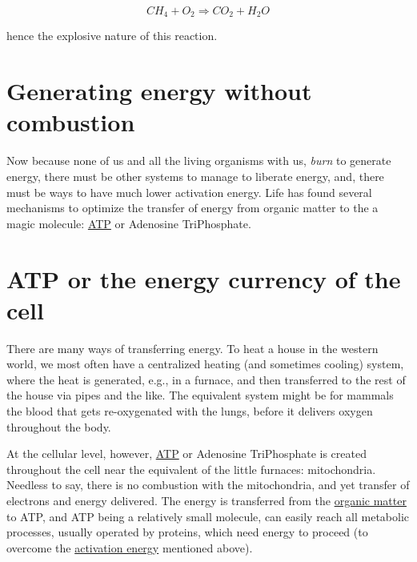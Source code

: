 \documentclass[]{book}
\theoremstyle{definition}
\theoremstyle{definition}
\theoremstyle{definition}
\theoremstyle{remark}
\begin{document}
\begin{equation}
CH_4 + O_2 \Rightarrow CO_2 + H_2O
\label{eq:CH4combustion}
\end{equation}

hence the explosive nature of this reaction.

\section{Generating energy without
combustion}\label{generating-energy-without-combustion}

Now because none of us and all the living organisms with us, \emph{burn}
to generate energy, there must be other systems to manage to liberate
energy, and, there must be ways to have much lower activation energy.
Life has found several mechanisms to optimize the transfer of energy
from organic matter to the a magic molecule:
\protect\hyperlink{ATP}{ATP} or Adenosine TriPhosphate.

\section{ATP or the energy currency of the
cell}\label{atp-or-the-energy-currency-of-the-cell}

There are many ways of transferring energy. To heat a house in the
western world, we most often have a centralized heating (and sometimes
cooling) system, where the heat is generated, e.g., in a furnace, and
then transferred to the rest of the house via pipes and the like. The
equivalent system might be for mammals the blood that gets re-oxygenated
with the lungs, before it delivers oxygen throughout the body.

At the cellular level, however, \protect\hyperlink{ATP}{ATP} or
Adenosine TriPhosphate is created throughout the cell near the
equivalent of the little furnaces: mitochondria. Needless to say, there
is no combustion with the mitochondria, and yet transfer of electrons
and energy delivered. The energy is transferred from the
\protect\hyperlink{OM}{organic matter} to ATP, and ATP being a
relatively small molecule, can easily reach all metabolic processes,
usually operated by proteins, which need energy to proceed (to overcome
the \href{https://en.wikipedia.org/wiki/Activation_energy}{activation
energy} mentioned above).
\end{document}
